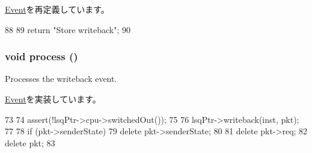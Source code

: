 \hyperlink{classEvent_a130ddddf003422b413e2e891b1b80e8f}{Event}を再定義しています。


\begin{DoxyCode}
88 {
89     return "Store writeback";
90 }
\end{DoxyCode}
\hypertarget{classLSQUnit_1_1WritebackEvent_a2e9c5136d19b1a95fc427e0852deab5c}{
\subsubsection[{process}]{\setlength{\rightskip}{0pt plus 5cm}void process ()}}
\label{classLSQUnit_1_1WritebackEvent_a2e9c5136d19b1a95fc427e0852deab5c}
Processes the writeback event. 

\hyperlink{classEvent_a142b75b68a6291400e20fb0dd905b1c8}{Event}を実装しています。


\begin{DoxyCode}
73 {
74     assert(!lsqPtr->cpu->switchedOut());
75 
76     lsqPtr->writeback(inst, pkt);
77 
78     if (pkt->senderState)
79         delete pkt->senderState;
80 
81     delete pkt->req;
82     delete pkt;
83 }
\end{DoxyCode}


